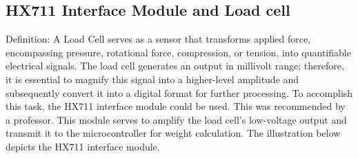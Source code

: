 \documentclass[../report.tex]{subfiles}
\begin{document}
\subsection{HX711 Interface Module and Load cell}

Definition: A Load Cell serves as a sensor that transforms applied force, encompassing pressure, rotational force, compression, or tension, into quantifiable electrical signals.
The load cell generates an output in millivolt range; therefore, it is essential to magnify this signal into a higher-level amplitude and subsequently convert it into a digital format for further processing.
To accomplish this task, the HX711 interface module could be used. This was recommended by a professor. This module serves to amplify the load cell's low-voltage output and transmit it to the microcontroller for weight calculation. 
The illustration below depicts the HX711 interface module.
\end{document}

